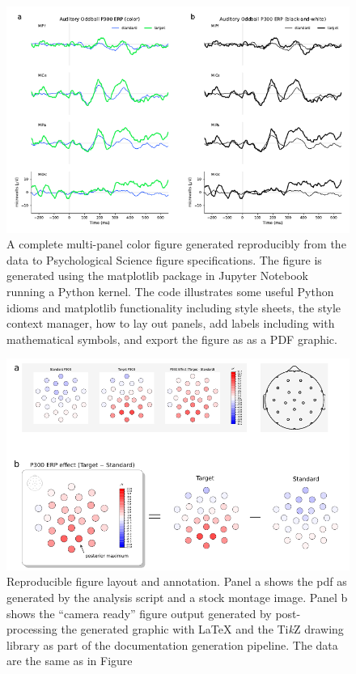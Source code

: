 \documentclass[helv,10pt,man,floatsintext]{apa6}  %
\begin{document}
\begin{figure}[ht]
  \caption{
    A complete multi-panel color figure generated
    reproducibly from the data to Psychological Science figure
    specifications. The figure is generated using the matplotlib package in
    Jupyter Notebook running a Python kernel. The code illustrates
    some useful Python idioms and matplotlib functionality including
    style sheets, the style context manager, how to lay out panels,
    add labels including with mathematical symbols, and export the figure as
     as a PDF graphic.
  }

  \centering
  \includegraphics[width=.95\textwidth]{apa_fig1.pdf}

\end{figure}



\begin{figure}[ht]
  \caption{Reproducible figure layout and annotation. Panel a shows
    the pdf as generated by the analysis script and a stock montage
    image. Panel b shows the ``camera ready'' figure output generated
    by post-processing the generated graphic with \LaTeX{} and the
    Ti{\it k}Z drawing library as part of the documentation generation
    pipeline. The data are the same as in Figure~
  } \includegraphics[width=\textwidth]{apa_fig2.pdf}
\end{figure}
\end{document}
